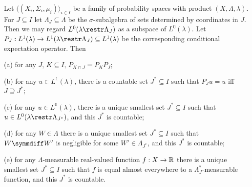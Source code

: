  Let
$\langle(X_i,\Sigma_i,\mu_i)\rangle_{i\in I}$ be a family of probability
spaces with product
$(X,\Lambda,\lambda)$.   For $J\subseteq I$ let
$\Lambda_J\subseteq\Lambda$ be the $\sigma$-subalgebra of sets
determined by coordinates in $J$.   Then we may regard
$L^0(\lambda\restr\Lambda_J)$ as a subspace of
$L^0(\lambda)$.    Let
$P_J:L^1(\lambda)\to L^1(\lambda\restr\Lambda_J)\subseteq L^1(\lambda)$
be the corresponding
conditional expectation operator.   Then

(a) for any $J$, $K\subseteq I$, $P_{K\cap J}=P_KP_J$;

(b) for any $u\in L^1(\lambda)$, there is a countable set
$J^*\subseteq I$ such that $P_Ju=u$ iff $J\supseteq J^*$;

(c) for any $u\in L^0(\lambda)$, there is a unique smallest set
$J^*\subseteq I$ such that $u\in L^0(\lambda\restr\Lambda_{J^*})$, and
this $J^*$ is countable;

(d) for any $W\in\Lambda$ there is a unique smallest set
$J^*\subseteq I$
such that $W\symmdiff W'$ is negligible for some $W'\in\Lambda_{J^*}$,
and this $J^*$ is countable;

(e) for any $\Lambda$-measurable real-valued function $f:X\to\Bbb R$
there is a unique smallest set $J^*\subseteq I$ such that $f$ is equal
almost everywhere to a $\Lambda_J^*$-measurable function, and this $J^*$
is countable.

